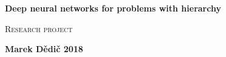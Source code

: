 \documentclass[a4paper,12pt]{report}
\begin{document}
\thispagestyle{empty}

\centering

\begin{minipage}[t][10cm][t]{15cm}
\end{minipage}

\vspace{1.5cm}

\textbf{\Large Deep neural networks for problems with hierarchy \\
}

\vspace{2ex}

{\Large \textsc{Research project}\\}

\vspace{2ex}

\textbf{\large Marek Dědič  2018}\\
\end{document}

